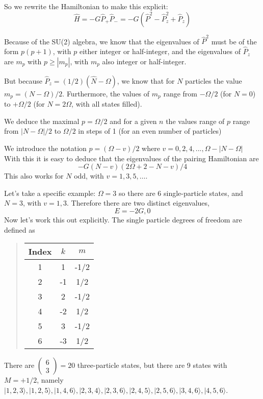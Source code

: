 \documentclass[%
twoside,                 %
final,                   %
10pt]{article}
\begin{document}
So we rewrite the Hamiltonian to make this explicit:
\[
\hat{H} = -G \hat{P}_+ \hat{P}_- 
= -G \left( \hat{P}^2 - \hat{P}_z^2 + \hat{P}_z\right)
\]




Because of the SU(2) algebra, we know that the eigenvalues of 
$\hat{P}^2$ must be of the form $p(p+1)$, with $p$ either integer or half-integer, and the eigenvalues of $\hat{P}_z$ 
are $m_p$ with $p \geq | m_p|$, with $m_p$ also integer or half-integer. 


But because $\hat{P}_z = (1/2)(\hat{N}-\Omega)$, we know that for $N$ particles 
the value $m_p = (N-\Omega)/2$. Furthermore, the values of $m_p$ range from 
$-\Omega/2$ (for $N=0$) to $+\Omega/2$ (for $N=2\Omega$, with all states filled). 

We deduce the maximal $p = \Omega/2$ and for a given $n$ the 
values range of $p$ range from $|N-\Omega|/2$ to $\Omega/2$ in steps of 1 
(for an even number of particles) 

We introduce the notation
$p = (\Omega - v)/2$
where $v = 0, 2, 4,..., \Omega - |N-\Omega|$ 
With this it is easy to deduce that the eigenvalues of the pairing Hamiltonian are
\[
-G(N-v)(2\Omega +2-N-v)/4
\]
This also works for $N$ odd, with $v= 1,3,5, \dots$.



Let's take a specific example: $\Omega = 3$ so there are 6 single-particle states, 
and $N = 3$, with $v= 1,3$. Therefore there are two distinct eigenvalues, 
\[
E = -2G, 0
\]
Now let's work this out explicitly. The single particle degrees of freedom are defined as


\begin{quote}
\begin{tabular}{ccc}
\hline
\multicolumn{1}{c}{ Index } & \multicolumn{1}{c}{ $k$ } & \multicolumn{1}{c}{ $m$ } \\
\hline
1     & 1   & -1/2 \\
2     & -1  & 1/2  \\
3     & 2   & -1/2 \\
4     & -2  & 1/2  \\
5     & 3   & -1/2 \\
6     & -3  & 1/2  \\
\hline
\end{tabular}
\end{quote}

\noindent
 There are  $\left( \begin{array}{c}6 \\ 3 \end{array} \right) = 20$ three-particle states, but there 
are 9 states with $M = +1/2$, namely
$| 1,2,3 \rangle, |1,2,5\rangle, | 1,4,6 \rangle, | 2,3,4 \rangle, |2,3,6 \rangle, | 2,4,5 \rangle, | 2, 5, 6 \rangle, |3,4,6 \rangle, | 4,5,6 \rangle$.
\end{document}
